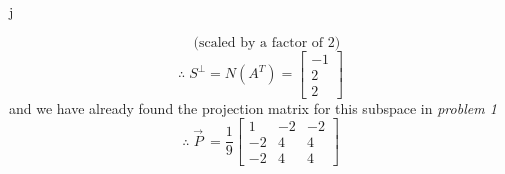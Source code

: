 j\documentclass[12pt]{article}
\begin{document}
\begin{enumerate}
\[             \;\;\; \text{(scaled by a factor of 2)}
             \]
             \[
             \therefore \; S^\perp = N(A^T) = 
             \begin{bmatrix}
                 -1\\2\\2
             \end{bmatrix}
             \]
            and we have already found the projection matrix for this subspace in \textit{problem 1}
            \[
            \therefore \; \vec P\ = 
                \frac{1}{9}
                \begin{bmatrix}
                    1&-2&-2\\
                    -2&4&4\\
                    -2&4&4
                \end{bmatrix}
            \]
            \\ \\ \\ 
	

\end{enumerate}
\end{document}
